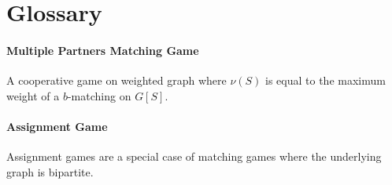\section{Glossary}
\paragraph{Multiple Partners Matching Game} A cooperative game on weighted graph where $\nu(S)$ is equal to the maximum weight of a $b$-matching on $G[S]$.
\paragraph{Assignment Game} Assignment games are a special case of matching games where the underlying graph is bipartite.
